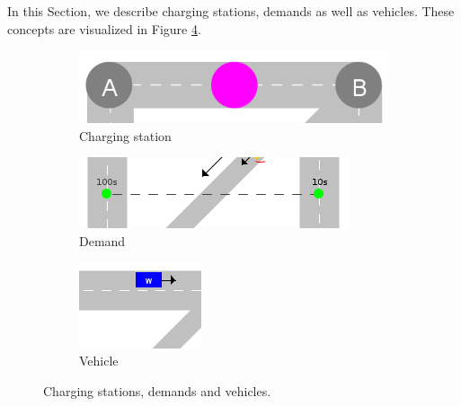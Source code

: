 \documentclass[graybox]{svmult}
\begin{document}
In this Section, we describe charging stations, demands as well as vehicles. These concepts are visualized in Figure \ref{fig:chargingstations-demands-vehicles}.

\begin{figure}[htbp]
	\hfill
	\begin{subfigure}{.3\textwidth}
		\centering
		\includegraphics[scale=0.25]{../../concepts/charge-station.png}
		\caption{Charging station}
		\label{fig:charging-station}	
	\end{subfigure}
	\hfill
	\begin{subfigure}{.3\textwidth}
		\centering
		\includegraphics[scale=0.4]{../../concepts/demand.png}
		\caption{Demand}
		\label{fig:demand}
	\end{subfigure}
	\hfill
	\begin{subfigure}{.3\textwidth}
		\centering
		\includegraphics[scale=0.6]{../../concepts/vehicle.png}
		\caption{Vehicle}
		\label{fig:vehicle}	
	\end{subfigure}

	\caption{Charging stations, demands and vehicles.}
	\label{fig:chargingstations-demands-vehicles}	
\end{figure}
\end{document}
